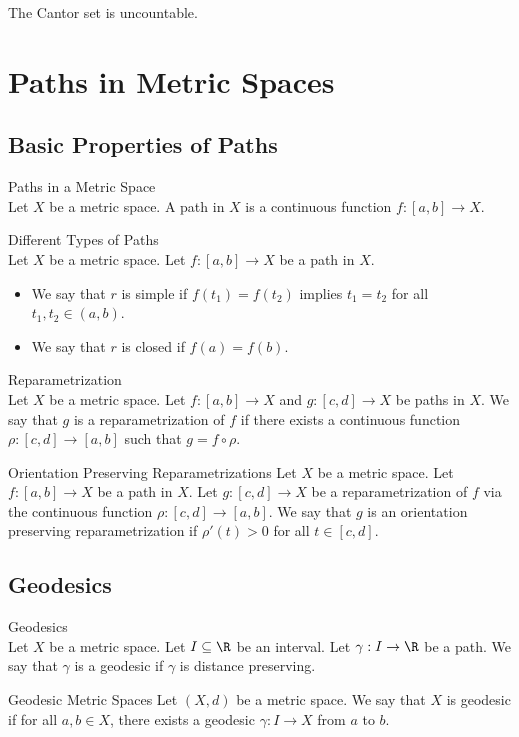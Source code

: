 \documentclass[a4paper]{article}
\begin{document}
\begin{lmm}{}{} The Cantor set is uncountable. 
\end{lmm}

\pagebreak
\section{Paths in Metric Spaces}
\subsection{Basic Properties of Paths}
\begin{defn}{Paths in a Metric Space}{}\\
Let $X$ be a metric space. A path in $X$ is a continuous function $f:[a,b]\to X$. 
\end{defn}

\begin{defn}{Different Types of Paths}{}\\
Let $X$ be a metric space. Let $f:[a,b]\to X$ be a path in $X$. 
\begin{itemize}
\item We say that $r$ is simple if $f(t_1)=f(t_2)$ implies $t_1=t_2$ for all $t_1,t_2\in(a,b)$. 
\item We say that $r$ is closed if $f(a)=f(b)$. 
\end{itemize}
\end{defn}

\begin{defn}{Reparametrization}{}\\
Let $X$ be a metric space. Let $f:[a,b]\to X$ and $g:[c,d]\to X$ be paths in $X$. We say that $g$ is a reparametrization of $f$ if there exists a continuous function $\rho:[c,d]\to[a,b]$ such that $g=f\circ\rho$. 
\end{defn}

\begin{defn}{Orientation Preserving Reparametrizations}{}
Let $X$ be a metric space. Let $f:[a,b]\to X$ be a path in $X$. Let $g:[c,d]\to X$ be a reparametrization of $f$ via the continuous function $\rho:[c,d]\to[a,b]$. We say that $g$ is an orientation preserving reparametrization if $\rho'(t)>0$ for all $t\in[c,d]$. 
\end{defn}

\subsection{Geodesics}
\begin{defn}{Geodesics}{}\\
Let $X$ be a metric space. Let $I\subseteq\R$ be an interval. Let $\gamma:I\to\R$ be a path. We say that $\gamma$ is a geodesic if $\gamma$ is distance preserving. 
\end{defn}

\begin{defn}{Geodesic Metric Spaces}{} Let $(X,d)$ be a metric space. We say that $X$ is geodesic if for all $a,b\in X$, there exists a geodesic $\gamma:I\to X$ from $a$ to $b$. 
\end{defn}
\end{document}
